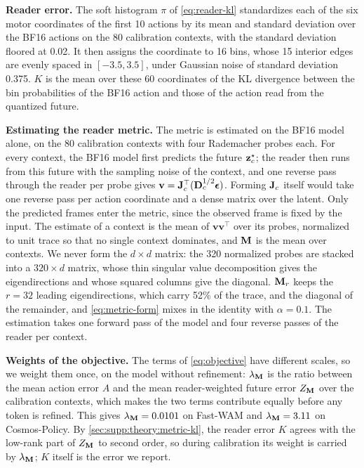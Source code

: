 \noindent\textbf{Reader error.}
The soft histogram $\pi$ of \cref{eq:reader-kl} standardizes each of the six motor coordinates of the first 10 actions by its mean and standard deviation over the BF16 actions on the 80 calibration contexts, with the standard deviation floored at 0.02.
It then assigns the coordinate to 16 bins, whose 15 interior edges are evenly spaced in $[-3.5, 3.5]$, under Gaussian noise of standard deviation 0.375.
$K$ is the mean over these 60 coordinates of the KL divergence between the bin probabilities of the BF16 action and those of the action read from the quantized future.

\noindent\textbf{Estimating the reader metric.}
The metric is estimated on the BF16 model alone, on the 80 calibration contexts with four Rademacher probes each.
For every context, the BF16 model first predicts the future $\mathbf{z}^\star_c$; the reader then runs from this future with the sampling noise of the context, and one reverse pass through the reader per probe gives $\mathbf{v} = \mathbf{J}_c^\top(\mathbf{D}_c^{1/2}\boldsymbol{\epsilon})$.
Forming $\mathbf{J}_c$ itself would take one reverse pass per action coordinate and a dense matrix over the latent.
Only the predicted frames enter the metric, since the observed frame is fixed by the input.
The estimate of a context is the mean of $\mathbf{v}\mathbf{v}^\top$ over its probes, normalized to unit trace so that no single context dominates, and $\mathbf{M}$ is the mean over contexts.
We never form the $d \times d$ matrix: the 320 normalized probes are stacked into a $320 \times d$ matrix, whose thin singular value decomposition gives the eigendirections and whose squared columns give the diagonal.
$\mathbf{M}_r$ keeps the $r = 32$ leading eigendirections, which carry 52\% of the trace, and the diagonal of the remainder, and \cref{eq:metric-form} mixes in the identity with $\alpha = 0.1$.
The estimation takes one forward pass of the model and four reverse passes of the reader per context.

\noindent\textbf{Weights of the objective.}
The terms of \cref{eq:objective} have different scales, so we weight them once, on the model without refinement: $\lambda_{\mathbf{M}}$ is the ratio between the mean action error $A$ and the mean reader-weighted future error $Z_{\mathbf{M}}$ over the calibration contexts, which makes the two terms contribute equally before any token is refined.
This gives $\lambda_{\mathbf{M}} = 0.0101$ on Fast-WAM and $\lambda_{\mathbf{M}} = 3.11$ on Cosmos-Policy.
By \cref{sec:supp:theory:metric-kl}, the reader error $K$ agrees with the low-rank part of $Z_{\mathbf{M}}$ to second order, so during calibration its weight is carried by $\lambda_{\mathbf{M}}$; $K$ itself is the error we report.


